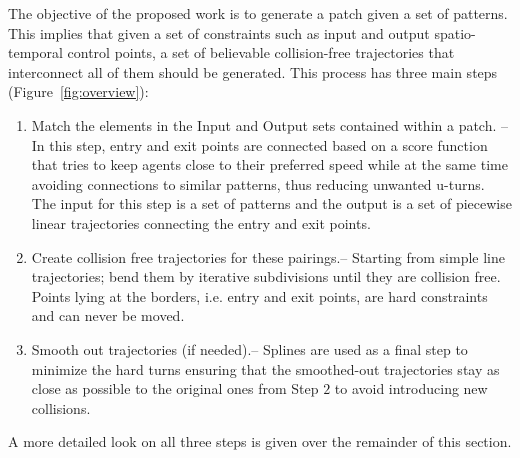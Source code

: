 The objective of the proposed work is to generate a patch given a set of patterns.
This implies that given a set of constraints such as input and output spatio-temporal control points, a set of believable collision-free trajectories that interconnect all of them should be generated.
This process has three main steps (Figure~\ref{fig:overview}):
\begin{enumerate}
  \item Match the elements in the Input and Output sets contained within a patch. {--}
  In this step, entry and exit points are connected based on a score function that tries to keep agents close to their preferred speed while at the same time avoiding connections to similar patterns, thus reducing unwanted u-turns.
  The input for this step is a set of patterns and the output is a set of piecewise linear trajectories connecting the entry and exit points.
  \item Create collision free trajectories for these pairings.{--}
  Starting from simple line trajectories; bend them by iterative subdivisions until they are collision free.
  Points lying at the borders, i.e. entry and exit points, are hard constraints and can never be moved.
  \item Smooth out trajectories (if needed).{--}
   Splines are used as a final step to minimize the hard turns ensuring that the smoothed-out trajectories stay as close as possible to the original ones from Step $2$ to avoid introducing new collisions.
\end{enumerate}

% 
% 
%       

A more detailed look on all three steps is given over the remainder of this section.

